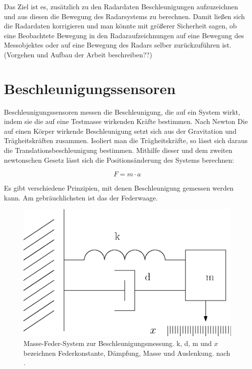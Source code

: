 \documentclass[12pt,a4paper]{scrartcl}
\begin{document}
Das Ziel ist es, zusätzlich zu den Radardaten Beschleunigungen aufzuzeichnen und aus diesen die Bewegung des Radarsystems zu berechnen. Damit ließen sich die Radardaten korrigieren und man könnte mit größerer Sicherheit sagen, ob eine Beobachtete Bewegung in den Radaraufzeichnungen auf eine Bewegung des Messobjektes oder auf eine Bewegung des Radars selber zurückzuführen ist.\\

{\color{red}(Vorgehen und Aufbau der Arbeit beschreiben??)}

\newpage

\section{Beschleunigungssensoren}
\onehalfspacing
Beschleunigungssensoren messen die Beschleunigung, die auf ein System wirkt, indem sie die auf eine Testmasse wirkenden Kräfte bestimmen. Nach Newton  Die auf einen Körper wirkende Beschleunigung setzt sich aus der Gravitation und Trägheitskräften zusammen. Isoliert man die Trägheitskräfte, so lässt sich daraus die Translationsbeschleunigung bestimmen. Mithilfe dieser und dem zweiten newtonschen Gesetz lässt sich die Positionsänderung des Systems berechnen: 

\begin{equation}
F = m \cdot a
\end{equation}

Es gibt verschiedene Prinzipien, mit denen Beschleunigung gemessen werden kann. Am gebräuchlichsten ist das der Federwaage.

\begin{figure}[H]
\centering
\includegraphics[scale=0.7]{federmasse.eps}
\caption{Masse-Feder-System zur Beschleunigungsmessung. k, d, m und $x$ bezeichnen Federkonstante, Dämpfung, Masse und Auslenkung. nach \citep{Klingbeil:2006qy}.}
\label{federwaage}
\end{figure}
\end{document}
